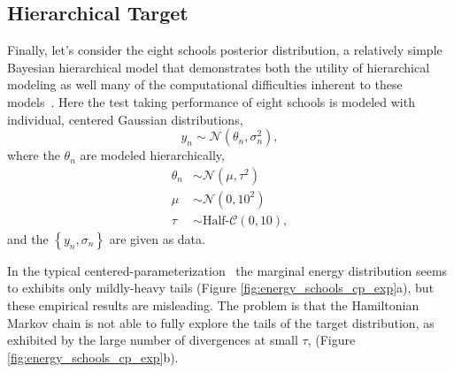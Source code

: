 \documentclass[stslayout]{imsart}
\begin{document}
\subsection{Hierarchical Target}

Finally, let's consider the eight schools posterior distribution, a relatively 
simple Bayesian hierarchical model that demonstrates both the utility of 
hierarchical modeling as well many of the computational difficulties inherent 
to these models~\citep{Rubin:1981, GelmanEtAl:2014a}.  Here the test taking
performance of eight schools is modeled with individual, centered Gaussian
distributions,
%
\begin{equation*}
y_{n} \sim \mathcal{N} \! \left( \theta_{n}, \sigma_{n}^{2} \right),
\end{equation*}
%
where the $\theta_{n}$ are modeled hierarchically,
%
\begin{align*}
\theta_{n} &\sim \mathcal{N} \! \left( \mu, \tau^{2} \right)
\\
\mu &\sim \mathcal{N} \! \left( 0, 10^{2} \right)
\\
\tau &\sim \text{Half-}\mathcal{C} \! \left( 0, 10 \right),
\end{align*}
%
and the $\left\{ y_{n}, \sigma_{n} \right\}$ are given as data.

In the typical centered-parameterization~\citep{PapaspiliopoulosEtAl:2007}
the marginal energy distribution seems to exhibits only mildly-heavy tails 
(Figure \ref{fig:energy_schools_cp_exp}a), but these empirical results are 
misleading.  The problem is that the Hamiltonian Markov chain is not able 
to fully explore the tails of the target distribution, as exhibited by the large 
number of divergences at small $\tau$, 
(Figure \ref{fig:energy_schools_cp_exp}b).
\end{document}
